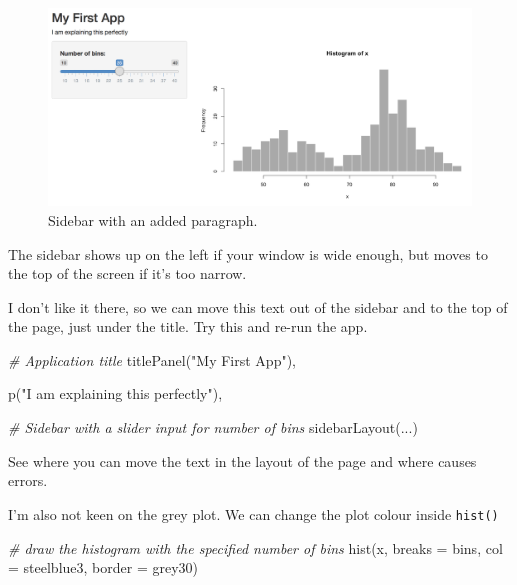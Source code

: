 \documentclass[
  oneside]{book}
\newenvironment{Shaded}{\begin{snugshade}}{\end{snugshade}}
\newcommand{\AttributeTok}[1]{\textcolor[rgb]{0.77,0.63,0.00}{#1}}
\newcommand{\CommentTok}[1]{\textcolor[rgb]{0.56,0.35,0.01}{\textit{#1}}}
\newcommand{\FunctionTok}[1]{\textcolor[rgb]{0.00,0.00,0.00}{#1}}
\newcommand{\NormalTok}[1]{#1}
\newcommand{\StringTok}[1]{\textcolor[rgb]{0.31,0.60,0.02}{#1}}
\begin{document}
\begin{figure}

{\centering \includegraphics[width=1\linewidth]{images/demo_app/07-app-sidebar-p} 

}

\caption{Sidebar with an added paragraph.}\label{fig:first-app-sidebar-p}
\end{figure}

\begin{info}
The sidebar shows up on the left if your window is wide enough, but moves to the top of the screen if it's too narrow.

\end{info}

I don't like it there, so we can move this text out of the sidebar and to the top of the page, just under the title. Try this and re-run the app.

\begin{Shaded}
\begin{Highlighting}[]
\CommentTok{\# Application title}
\FunctionTok{titlePanel}\NormalTok{(}\StringTok{"My First App"}\NormalTok{),}

\FunctionTok{p}\NormalTok{(}\StringTok{"I am explaining this perfectly"}\NormalTok{),}

\CommentTok{\# Sidebar with a slider input for number of bins}
\FunctionTok{sidebarLayout}\NormalTok{(...)}
\end{Highlighting}
\end{Shaded}

\begin{try}
See where you can move the text in the layout of the page and where causes errors.

\end{try}

I'm also not keen on the grey plot. We can change the plot colour inside \texttt{hist()}

\begin{Shaded}
\begin{Highlighting}[]
\CommentTok{\# draw the histogram with the specified number of bins}
\FunctionTok{hist}\NormalTok{(x, }\AttributeTok{breaks =}\NormalTok{ bins, }\AttributeTok{col =} \StringTok{\textquotesingle{}steelblue3\textquotesingle{}}\NormalTok{, }\AttributeTok{border =} \StringTok{\textquotesingle{}grey30\textquotesingle{}}\NormalTok{)}
\end{Highlighting}
\end{Shaded}
\end{document}
